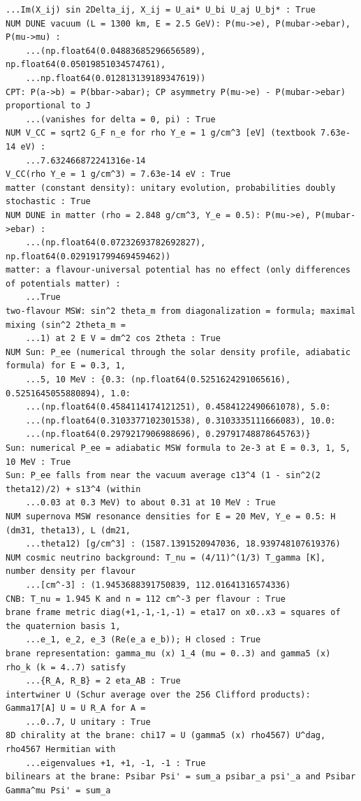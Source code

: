 \documentclass[10pt,a4paper]{article}
\begin{document}
\begin{Verbatim}[fontsize=\small,frame=single,framesep=2mm]
    ...Im(X_ij) sin 2Delta_ij, X_ij = U_ai* U_bi U_aj U_bj* : True
NUM DUNE vacuum (L = 1300 km, E = 2.5 GeV): P(mu->e), P(mubar->ebar), P(mu->mu) :
    ...(np.float64(0.04883685296656589), np.float64(0.05019851034574761),
    ...np.float64(0.012813139189347619))
CPT: P(a->b) = P(bbar->abar); CP asymmetry P(mu->e) - P(mubar->ebar) proportional to J
    ...(vanishes for delta = 0, pi) : True
NUM V_CC = sqrt2 G_F n_e for rho Y_e = 1 g/cm^3 [eV] (textbook 7.63e-14 eV) :
    ...7.632466872241316e-14
V_CC(rho Y_e = 1 g/cm^3) = 7.63e-14 eV : True
matter (constant density): unitary evolution, probabilities doubly stochastic : True
NUM DUNE in matter (rho = 2.848 g/cm^3, Y_e = 0.5): P(mu->e), P(mubar->ebar) :
    ...(np.float64(0.07232693782692827), np.float64(0.029191799469459462))
matter: a flavour-universal potential has no effect (only differences of potentials matter) :
    ...True
two-flavour MSW: sin^2 theta_m from diagonalization = formula; maximal mixing (sin^2 2theta_m =
    ...1) at 2 E V = dm^2 cos 2theta : True
NUM Sun: P_ee (numerical through the solar density profile, adiabatic formula) for E = 0.3, 1,
    ...5, 10 MeV : {0.3: (np.float64(0.5251624291065616), 0.5251645055880894), 1.0:
    ...(np.float64(0.4584114174121251), 0.4584122490661078), 5.0:
    ...(np.float64(0.3103377102301538), 0.3103335111666083), 10.0:
    ...(np.float64(0.2979217906988696), 0.29791748878645763)}
Sun: numerical P_ee = adiabatic MSW formula to 2e-3 at E = 0.3, 1, 5, 10 MeV : True
Sun: P_ee falls from near the vacuum average c13^4 (1 - sin^2(2 theta12)/2) + s13^4 (within
    ...0.03 at 0.3 MeV) to about 0.31 at 10 MeV : True
NUM supernova MSW resonance densities for E = 20 MeV, Y_e = 0.5: H (dm31, theta13), L (dm21,
    ...theta12) [g/cm^3] : (1587.1391520947036, 18.939748107619376)
NUM cosmic neutrino background: T_nu = (4/11)^(1/3) T_gamma [K], number density per flavour
    ...[cm^-3] : (1.9453688391750839, 112.01641316574336)
CNB: T_nu = 1.945 K and n = 112 cm^-3 per flavour : True
brane frame metric diag(+1,-1,-1,-1) = eta17 on x0..x3 = squares of the quaternion basis 1,
    ...e_1, e_2, e_3 (Re(e_a e_b)); H closed : True
brane representation: gamma_mu (x) 1_4 (mu = 0..3) and gamma5 (x) rho_k (k = 4..7) satisfy
    ...{R_A, R_B} = 2 eta_AB : True
intertwiner U (Schur average over the 256 Clifford products): Gamma17[A] U = U R_A for A =
    ...0..7, U unitary : True
8D chirality at the brane: chi17 = U (gamma5 (x) rho4567) U^dag, rho4567 Hermitian with
    ...eigenvalues +1, +1, -1, -1 : True
bilinears at the brane: Psibar Psi' = sum_a psibar_a psi'_a and Psibar Gamma^mu Psi' = sum_a

\end{Verbatim}
\end{document}
